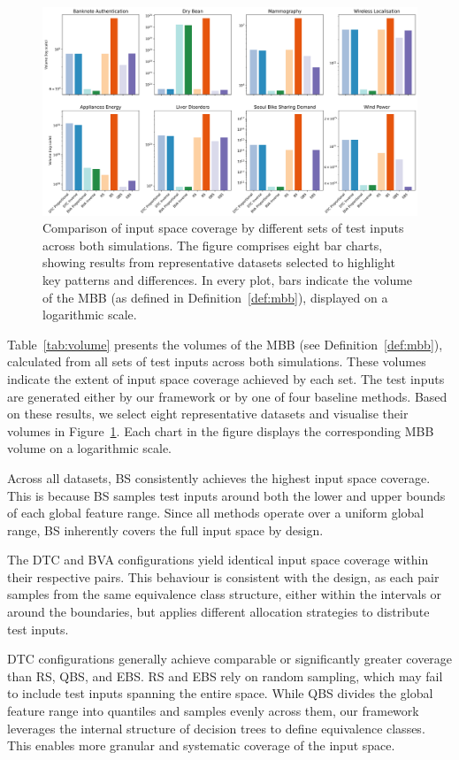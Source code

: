 \documentclass[
]{ceurart}
\theoremstyle{definition}
\begin{document}
\begin{figure}
\centering
\includegraphics[width=\linewidth]{img/volume_plot}
\caption{Comparison of input space coverage by different sets of test inputs across both simulations. The figure comprises eight bar charts, showing results from representative datasets selected to highlight key patterns and differences. In every plot, bars indicate the volume of the MBB (as defined in Definition~\ref{def:mbb}), displayed on a logarithmic scale.}
\label{fig:volume}
\end{figure}

Table~\ref{tab:volume} presents the volumes of the MBB (see Definition~\ref{def:mbb}), calculated from all sets of test inputs across both simulations. These volumes indicate the extent of input space coverage achieved by each set. The test inputs are generated either by our framework or by one of four baseline methods. Based on these results, we select eight representative datasets and visualise their volumes in Figure~\ref{fig:volume}. Each chart in the figure displays the corresponding MBB volume on a logarithmic scale.

Across all datasets, BS consistently achieves the highest input space coverage. This is because BS samples test inputs around both the lower and upper bounds of each global feature range. Since all methods operate over a uniform global range, BS inherently covers the full input space by design.

The DTC and BVA configurations yield identical input space coverage within their respective pairs. This behaviour is consistent with the design, as each pair samples from the same equivalence class structure, either within the intervals or around the boundaries, but applies different allocation strategies to distribute test inputs.

DTC configurations generally achieve comparable or significantly greater coverage than RS, QBS, and EBS. RS and EBS rely on random sampling, which may fail to include test inputs spanning the entire space. While QBS divides the global feature range into quantiles and samples evenly across them, our framework leverages the internal structure of decision trees to define equivalence classes. This enables more granular and systematic coverage of the input space.
\end{document}
